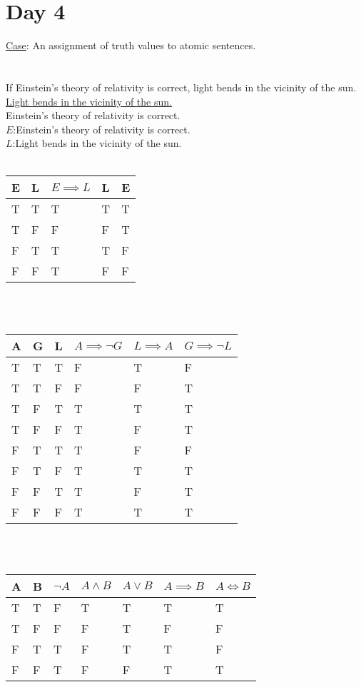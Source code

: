 \documentclass{article}
\begin{document}
\section{Day 4}
\underline{Case}: An assignment of truth values to atomic sentences.\\
\\
\\If Einstein's theory of relativity is correct, light bends in the vicinity of the sun.
\\\underline{Light bends in the vicinity of the sun.}
\\Einstein's theory of relativity is correct.
\\
$E$:Einstein's theory of relativity is correct.\\
$L$:Light bends in the vicinity of the sun.\\
\\
\begin{tabular}{l | l || l | l || l}
	E & L & $E \implies L$ & L & E\\ \hline
	T & T & T & T & T\\
	T & F & F & F & T\\
	F & T & T & T & F\\
	F & F & T & F & F\\
\end{tabular}\\
\\
\begin{tabular}{l | l | l || l | l || l}
	A & G & L & $A \implies \lnot G$ & $L \implies A$ & $G \implies \lnot L$\\ \hline
	T & T & T & F & T & F\\
	T & T & F & F & F & T\\
	T & F & T & T & T & T\\
	T & F & F & T & F & T\\
	F & T & T & T & F & F\\
	F & T & F & T & T & T\\
	F & F & T & T & F & T\\
	F & F & F & T & T & T\\
\end{tabular}\\
\\
\begin{tabular}{l | l || l | l | l | l | l}
	A & B & $\lnot A$ & $A \land B$ & $A \lor B$ & $A \implies B$ & $A \iff B$\\ \hline
	T & T & F & T & T & T & T\\
	T & F & F & F & T & F & F\\
	F & T & T & F & T & T & F\\
	F & F & T & F & F & T & T\\
\end{tabular}\\
\\
\end{document}
